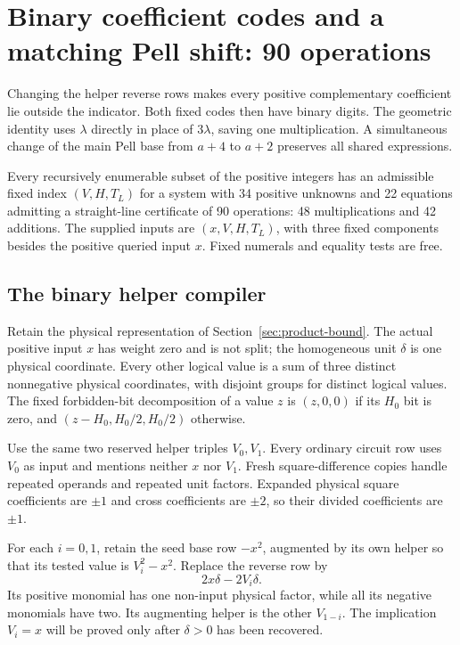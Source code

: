 \section{Binary coefficient codes and a matching Pell shift: 90 operations}
\label{sec:binary-product}

Changing the helper reverse rows makes every positive complementary
coefficient lie outside the indicator. Both fixed codes then have binary
digits. The geometric identity uses $\lambda$ directly in place of
$3\lambda$, saving one multiplication. A simultaneous change of the
main Pell base from $a+4$ to $a+2$ preserves all shared expressions.

\begin{theorem}\label{thm:best90}
Every recursively enumerable subset of the positive integers has an
admissible fixed index $(V,H,T_L)$ for a system with 34 positive unknowns
and 22 equations admitting a straight-line certificate of 90 operations:
48 multiplications and 42 additions. The supplied inputs are
$(x,V,H,T_L)$, with three fixed components besides the positive queried
input $x$. Fixed numerals and equality tests are free.
\end{theorem}

\subsection{The binary helper compiler}

Retain the physical representation of Section~\ref{sec:product-bound}.
The actual positive input $x$ has weight zero and is not split; the
homogeneous unit $\delta$ is one physical coordinate. Every other
logical value is a sum of three distinct nonnegative physical
coordinates, with disjoint groups for distinct logical values. The
fixed forbidden-bit decomposition of a value $z$ is $(z,0,0)$ if its
$H_0$ bit is zero, and $(z-H_0,H_0/2,H_0/2)$ otherwise.

Use the same two reserved helper triples $V_0,V_1$. Every ordinary
circuit row uses $V_0$ as input and mentions neither $x$ nor $V_1$.
Fresh square-difference copies handle repeated operands and repeated
unit factors. Expanded physical square coefficients are $\pm1$ and
cross coefficients are $\pm2$, so their divided coefficients are
$\pm1$.

For each $i=0,1$, retain the seed base row $-x^2$, augmented by its
own helper so that its tested value is $V_i^2-x^2$. Replace the
reverse row by
\begin{equation}\label{eq:binary-product-reverse}
 2x\delta-2V_i\delta.
\end{equation}
Its positive monomial has one non-input physical factor, while all
its negative monomials have two. Its augmenting helper is the other
$V_{1-i}$. The implication $V_i=x$ will be proved only after
$\delta>0$ has been recovered.

